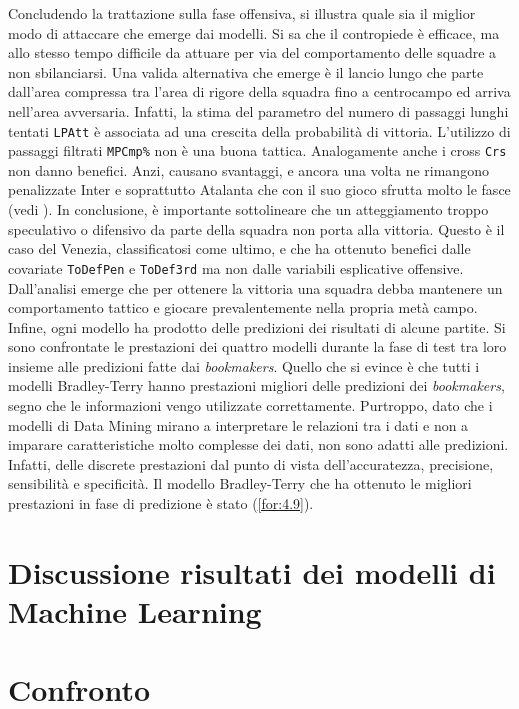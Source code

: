 Concludendo la trattazione sulla fase offensiva, si illustra quale sia il miglior modo di attaccare che emerge dai modelli. Si sa che il contropiede è efficace, ma allo stesso tempo difficile da attuare per via del comportamento delle squadre a non sbilanciarsi. Una valida alternativa che emerge è il lancio lungo che parte dall'area compressa tra l'area di rigore della squadra fino a centrocampo ed arriva nell'area avversaria. Infatti, la stima del parametro del numero di passaggi lunghi tentati \texttt{LPAtt} è associata ad una crescita della probabilità di vittoria. L'utilizzo di passaggi filtrati \texttt{MPCmp\%} non è una buona tattica. Analogamente anche i cross \texttt{Crs} non danno benefici. Anzi, causano svantaggi, e ancora una volta ne rimangono penalizzate Inter e soprattutto Atalanta che con il suo gioco sfrutta molto le fasce (vedi \textit{\cite{ataGioco}}). In conclusione, è importante sottolineare che un atteggiamento troppo speculativo o difensivo da parte della squadra non porta alla vittoria. Questo è il caso del Venezia, classificatosi come ultimo, e che ha ottenuto benefici dalle covariate \texttt{ToDefPen} e \texttt{ToDef3rd} ma non dalle variabili esplicative offensive. Dall'analisi emerge che per ottenere la vittoria una squadra debba mantenere un comportamento tattico e giocare prevalentemente nella propria metà campo.\\
Infine, ogni modello ha prodotto delle predizioni dei risultati di alcune partite. Si sono confrontate le prestazioni dei quattro modelli durante la fase di test tra loro insieme alle predizioni fatte dai \emph{bookmakers}. Quello che si evince è che tutti i modelli Bradley-Terry hanno prestazioni migliori delle predizioni dei \emph{bookmakers}, segno che le informazioni vengo utilizzate correttamente. Purtroppo, dato che i modelli di Data Mining mirano a interpretare le relazioni tra i dati e non a imparare caratteristiche molto complesse dei dati, non sono adatti alle predizioni. Infatti, delle discrete prestazioni dal punto di vista dell'accuratezza, precisione, sensibilità e specificità. Il modello Bradley-Terry che ha ottenuto le migliori prestazioni in fase di predizione è stato (\ref{for:4.9}).
\section{Discussione risultati dei modelli di Machine Learning}

\section{Confronto}